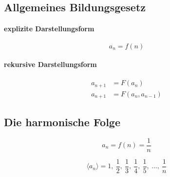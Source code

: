 \subsection{Allgemeines Bildungsgesetz}

\paragraph{explizite Darstellungsform}

\[
	a_n = f(n)
\]

\paragraph{rekursive Darstellungsform}

\begin{align*}
	a_{n+1} & = F(a_n)          \\
	a_{n+1} & = F(a_n, a_{n-1}) 
\end{align*}

\subsection{Die harmonische Folge}

\[
	a_n = f(n) = \frac{1}{n}
\]

\[
	\langle a_n \rangle = 1,\ \frac{1}{2},\ \frac{1}{3},\ \frac{1}{4},\ \frac{1}{5},\ \ldots,\ \frac{1}{n}
\]
